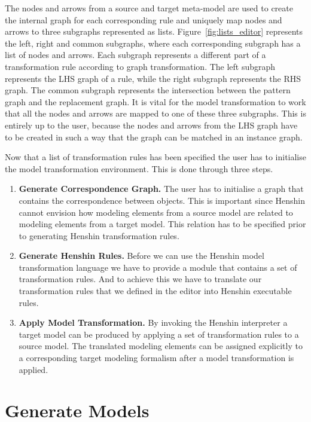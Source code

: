 The nodes and arrows from a source and target meta-model are used to create the
internal graph for each corresponding rule and uniquely map nodes and arrows to
three subgraphs represented as lists.
Figure~\ref{fig:lists_editor} represents the left, right and common subgraphs,
where each corresponding subgraph has a list of nodes and arrows. Each subgraph
represents a different part of a transformation rule according to graph
transformation. The left subgraph represents the LHS graph of a rule, while the
right subgraph represents the RHS graph. The common subgraph represents the
intersection between the pattern graph and the replacement graph. It is vital
for the model transformation to work that all the nodes and arrows are mapped
to one of these three subgraphs. This is entirely up to the user, because the
nodes and arrows from the LHS graph have to be created in such a way that the graph
can be matched in an instance graph.

Now that a list of transformation rules has been specified the user has to
initialise the model transformation environment. This is done through three
steps. 

\begin{enumerate}

\item \textbf{Generate Correspondence Graph.} The user has to
initialise a graph that contains the correspondence between objects. This is
important since Henshin cannot envision how modeling elements from a source
model are related to modeling elements from a target model. This relation has
to be specified prior to generating Henshin transformation rules. 

\item \textbf{Generate Henshin Rules.} Before we can use the Henshin model
transformation language we have to provide a module that contains a set of
transformation rules. And to achieve this we have to translate our
transformation rules that we defined in the editor into Henshin executable
rules.

\item \textbf{Apply Model Transformation.} By invoking the Henshin interpreter a
target model can be produced by applying a set of transformation rules to a
source model. The translated modeling elements can be assigned explicitly
to a corresponding target modeling formalism after a model transformation is
applied.

\end{enumerate}


\section{Generate Models}

